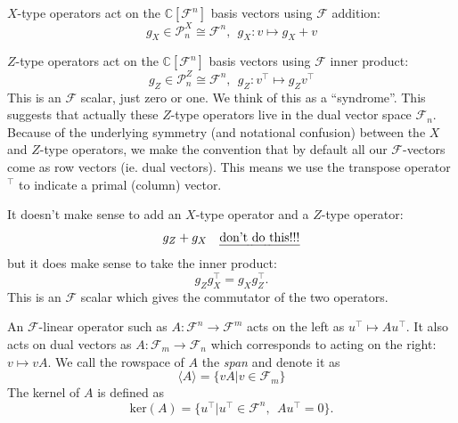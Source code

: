 \documentclass[11pt,oneside]{article}
\def\Complex{\mathbb{C}}
\def\Pauli{\mathcal{P}}
\def\Span#1{\langle #1 \rangle}
\newcommand{\Field}{\mathcal{F}}
\def\Ker{\mathrm{ker}}
\def\Fn{\Field^n}
\def\Fm{\Field^m}
\def\Fnd{\Field_{n}}
\def\Fmd{\Field_{m}}
\begin{document}
$X$-type operators act on the $\Complex[\Fn]$
basis vectors using $\Field$ addition:
$$
    g_X \in \Pauli^X_n \cong \Fn, \ \ g_X : v \longmapsto g_X + v
$$

$Z$-type operators act on the
$\Complex[\Fn]$ basis vectors using $\Field$ inner product:
$$
    g_Z \in \Pauli^Z_n \cong \Fn, \ \ g_Z : v^\top \longmapsto g_Z v^\top
$$
This is an $\Field$ scalar, just zero or one. We think of this
as a ``syndrome''.
This suggests that actually these $Z$-type operators
live in the dual vector space $\Fnd.$
Because of the underlying symmetry
(and notational confusion)
between the $X$ and $Z$-type operators,
we make the convention that by default
all our $\Field$-vectors come as row vectors (ie. dual vectors).
This means we use the transpose operator $^\top$ to
indicate a primal (column) vector.

It doesn't make sense to add an $X$-type operator and
a $Z$-type operator:
$$
    g_Z + g_X \ \ \ \mbox{\emph{don't do this!!!}}
$$
but it does make sense to take the inner product:
$$
    g_Z g_X^\top = g_X g_Z^\top.
$$
This is an $\Field$ scalar which gives the commutator of the 
two operators.

An $\Field$-linear operator such as
$ A : \Fn \to \Fm $
acts on the left as $ u^\top \mapsto A u^\top.$
It also acts on dual vectors as
$ A : \Fmd \to \Fnd $
which corresponds to acting on the right: $v \mapsto vA.$ 
We call the rowspace of 
$A$ the \emph{span} and denote 
it as 
$$\Span{A} = \{ vA | v \in \Fmd \}$$
The kernel of $A$ is defined as
$$
    \Ker(A) = \{ u^\top | u^\top \in \Fn,\ \  A u^\top = 0 \}.
$$
\end{document}
